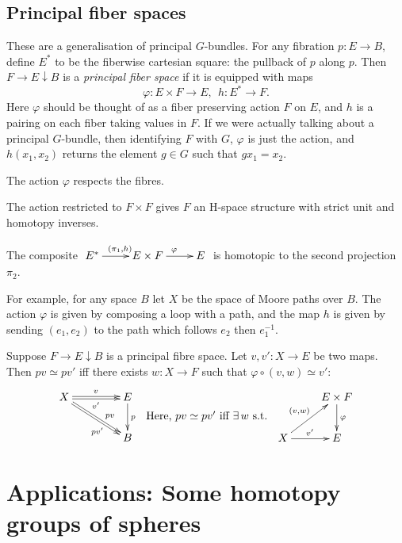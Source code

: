\documentclass[11pt]{article}
\begin{document}
{\subsection{Principal fiber spaces}
These are a generalisation of principal $G$-bundles. For any fibration $p:E\to B$, define $E^*$ to be the fiberwise cartesian square: the pullback of $p$ along $p$. Then $F\rightarrow E\downarrow B$ is a \emph{principal fiber space} if it is equipped with maps 
\[\varphi:E\times F\to E,\ \ h:E^*\to F.\]
Here $\varphi$ should be thought of as a fiber preserving action $F$ on $E$, and $h$ is a pairing on each fiber taking values in $F$. If we were actually talking about a principal $G$-bundle, then identifying $F$ with $G$, $\varphi$ is just the action, and $h(x_1,x_2)$ returns the element $g\in G$ such that $gx_1=x_2$.
\begin{itemise}
\item The action $\varphi$ respects the fibres.
\item The action restricted to $F\times F$ gives $F$ an H-space structure with strict unit and homotopy inverses.
\item The composite $\xymatrix{E^*\ar[r]^{(\pi_1,h)}&E\times F\ar[r]^{\varphi}&E}$ is homotopic to the second projection $\pi_2$.
\end{itemise}
For example, for any space $B$ let $X$ be the space of Moore paths over $B$. The action $\varphi$ is given by composing a loop with a path, and the map $h$ is given by sending $(e_1,e_2)$ to the path which follows $e_2$ then $e_1^{-1}$.
\begin{prop*}
Suppose $F\rightarrow E\downarrow B$ is a principal fibre space. Let $v,v':X\to E$ be two maps. Then $pv\simeq pv'$ iff there exists $w:X\to F$ such that $\varphi\circ(v,w)\simeq v'$:
\[\xymatrix@C=1.5cm{
X\ar@<.25ex>[r]^v\ar@<-.25ex>[r]_{v'}\ar@<.25ex>[dr]^(.63){pv}\ar@<-.25ex>[rd]_(.63){pv'}&E\ar[d]^p\\
&B
}\raisebox{-.6cm}{ \ Here, $pv\simeq pv'$ iff $\exists\, w$ s.t.\ \ }
\xymatrix{
&E\times F\ar[d]^\varphi\\
X\ar[ur]^{(v,w)}\ar[r]^{v'}&E
}\]
\end{prop*}

\section{Applications: Some homotopy groups of spheres}
\setcounter{subsection}{1}
}
\end{document}
